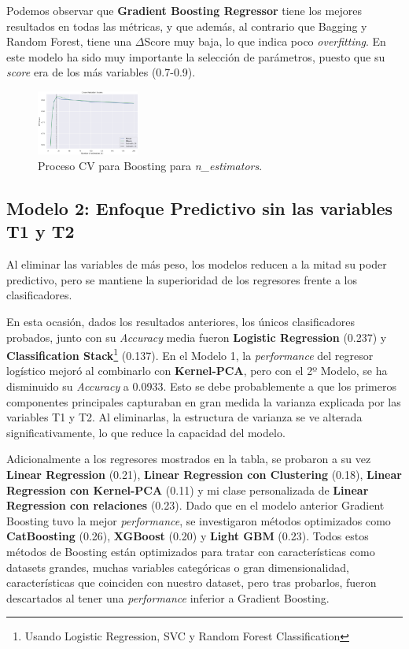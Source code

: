 \documentclass{article}
\begin{document}
Podemos observar que \textbf{Gradient Boosting Regressor} tiene los mejores resultados en todas las métricas, y que además, al contrario que Bagging y Random Forest, tiene una $\Delta$Score muy baja, lo que indica poco \textit{overfitting}.
En este modelo ha sido muy importante la selección de parámetros, puesto que su \textit{score} era de los más variables (0.7-0.9).

\begin{figure}[ht]
  \centering
  \includegraphics[width=0.3\textwidth]{CV_Boosting_N.png}
  \caption{Proceso CV para Boosting para \textit{n\_estimators}.}
\end{figure}

\subsection{Modelo 2: Enfoque Predictivo sin las variables T1 y T2}

Al eliminar las variables de más peso, los modelos reducen a la mitad su poder predictivo, pero se mantiene la superioridad de los regresores frente a los clasificadores.

En esta ocasión, dados los resultados anteriores, los únicos clasificadores probados, junto con su \textit{Accuracy} media fueron \textbf{Logistic Regression} (0.237) y \textbf{Classification Stack}\footnote{Usando Logistic Regression, SVC y Random Forest Classification} (0.137).
En el Modelo 1, la \textit{performance} del regresor logístico mejoró al combinarlo con \textbf{Kernel-PCA}, pero con el 2º Modelo, se ha disminuido su \textit{Accuracy} a 0.0933. Esto se debe probablemente a que los primeros componentes principales capturaban en gran medida la varianza explicada 
por las variables T1 y T2. Al eliminarlas, la estructura de varianza se ve alterada significativamente, lo que reduce la capacidad del modelo.

Adicionalmente a los regresores mostrados en la tabla, se probaron a su vez \textbf{Linear Regression} (0.21), \textbf{Linear Regression con Clustering} (0.18), \textbf{Linear Regression con Kernel-PCA} (0.11) y mi clase personalizada de \textbf{Linear Regression con relaciones} (0.23). Dado que 
en el modelo anterior Gradient Boosting tuvo la mejor \textit{performance}, se investigaron métodos optimizados como \textbf{CatBoosting} (0.26), \textbf{XGBoost} (0.20) y \textbf{Light GBM} (0.23). Todos estos métodos de Boosting 
están optimizados para tratar con características como datasets grandes, muchas variables categóricas o gran dimensionalidad, características que coinciden con nuestro dataset, pero tras probarlos, fueron descartados al tener una \textit{performance} inferior a Gradient Boosting.
\end{document}
